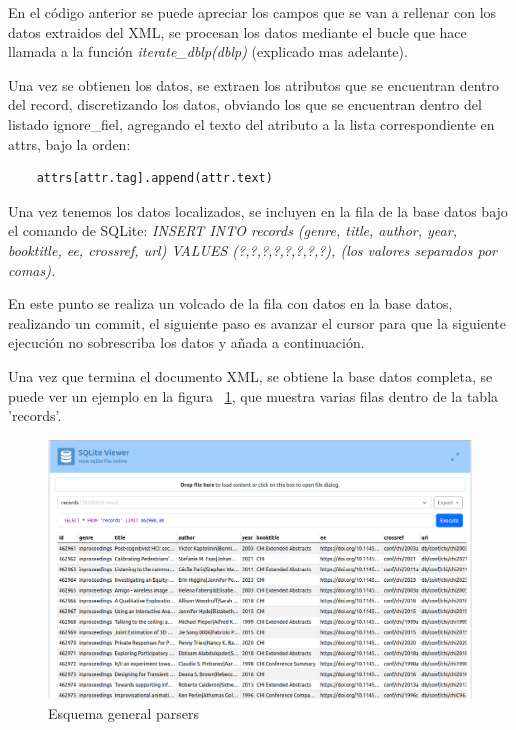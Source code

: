 \documentclass[a4paper, 12pt]{book}
\begin{document}
En el código anterior se puede apreciar los campos que se van a rellenar con los datos extraidos del XML, se procesan los datos mediante el bucle que hace llamada a la función \textit{iterate\_dblp(dblp)} (explicado mas adelante). 

Una vez se obtienen los datos, se extraen los atributos que se encuentran dentro del record, discretizando los datos, obviando los que se encuentran dentro del listado ignore\_fiel, agregando el texto del atributo a la lista correspondiente en attrs, bajo la orden:

\begin{verbatim}
    attrs[attr.tag].append(attr.text)
\end{verbatim}

Una vez tenemos los datos localizados, se incluyen en la fila de la base datos bajo el comando de SQLite:\textit{ INSERT INTO records (genre, title, author, year, booktitle, ee, crossref, url) VALUES (?,?,?,?,?,?,?,?), (los valores separados por comas).}

En este punto se realiza un volcado de la fila con datos en la base datos, realizando un commit, el siguiente paso es avanzar el cursor para que la siguiente ejecución no sobrescriba los datos y añada a continuación.

Una vez que termina el documento XML, se obtiene la base datos completa, se puede ver un ejemplo en la figura ~\ref{fig:ej_bd}, que muestra varias filas dentro de la tabla 'records'.

\begin{figure}[h]
  \centering
  \includegraphics[width=15cm, keepaspectratio]{img/ej_bd.png}
  \caption{Esquema general parsers}
  \label{fig:ej_bd}
\end{figure}
\end{document}
